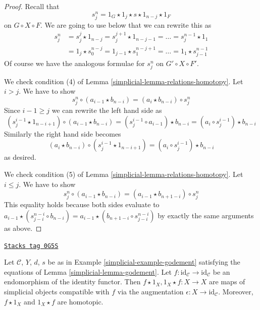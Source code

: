 \begin{proof}
\medskip\noindent
Recall that
$$
s^n_j = 1_G \star 1_j \star s \star 1_{n - j} \star 1_F
$$
on $G \circ X \circ F$. We are going to use below
that we can rewrite this as
\begin{align*}
s^n_j
& =
s^j_j \star 1_{n - j} = s^{j + 1}_j \star 1_{n - j - 1} = \ldots =
s^{n - 1}_j \star 1_1 \\
& =
1_j \star s^{n - j}_0 = 1_{j - 1} \star s^{n - j + 1}_1 = \ldots =
1_1 \star s^{n - 1}_{j - 1}
\end{align*}
Of course we have the analogous formulae for $s^n_j$ on $G' \circ X \circ F'$.

\medskip\noindent
We check condition (4) of Lemma \ref{simplicial-lemma-relations-homotopy}.
Let $i > j$. We have to show
$$
s^n_j \circ (a_{i - 1} \star b_{n - i}) =
(a_i \star b_{n - i}) \circ s^n_j
$$
Since $i - 1 \geq j$ we can rewrite the left hand side as
$$
(s^{i - 1}_j \star 1_{n - i + 1}) \circ (a_{i - 1} \star b_{n - i}) =
(s^{i - 1}_j \circ a_{i - 1}) \star b_{n - i} =
(a_i \circ s^{i - 1}_j) \star b_{n - i}
$$
Similarly the right hand side becomes
$$
(a_i \star b_{n - i}) \circ (s^{i - 1}_j \star 1_{n - i + 1}) =
(a_i \circ s^{i - 1}_j) \star b_{n - i}
$$
as desired.

\medskip\noindent
We check condition (5) of Lemma \ref{simplicial-lemma-relations-homotopy}.
Let $i \leq j$. We have to show
$$
s^n_j \circ (a_{i - 1} \star b_{n - i}) =
(a_{i - 1} \star b_{n + 1 - i}) \circ s^n_j
$$
This equality holds because both sides evaluate to
$a_{i - 1} \star (s^{n - i}_{j - i} \circ b_{n - i}) =
a_{i - 1} \star (b_{n + 1 - i} \circ s^{n - i}_{j - i})$
by exactly the same arguments as above.
\end{proof}

\begin{lemma}
\label{simplicial-lemma-godement-before-after}
\href{https://stacks.math.columbia.edu/tag/0G5S}{\texttt{Stacks tag 0G5S}}

Let $\mathcal{C}$, $Y$, $d$, $s$ be as in Example \ref{simplicial-example-godement}
satisfying the equations of Lemma \ref{simplicial-lemma-godement}. Let
$f : \text{id}_\mathcal{C} \to \text{id}_\mathcal{C}$ be an endomorphism
of the identity functor. Then $f \star 1_X, 1_X \star f : X \to X$
are maps of simplicial objects compatible with $f$ via the augmentation
$\epsilon : X \to \text{id}_\mathcal{C}$. Moreover, $f \star 1_X$
and $1_X \star f$ are homotopic.
\end{lemma}

